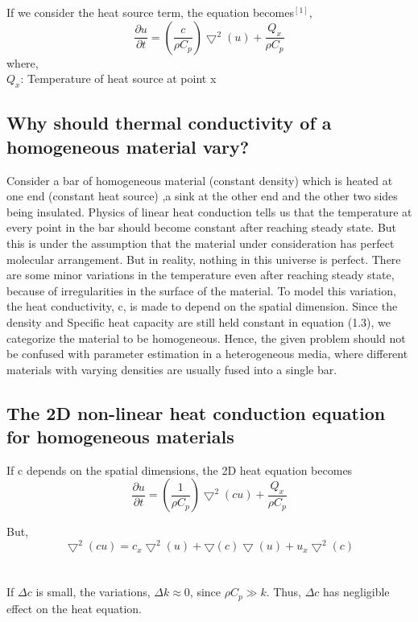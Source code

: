 \documentclass[10pt,a4paper]{report}
\begin{document}
If we consider the heat source term, the equation becomes$^{[1]}$,
\begin{equation}
\frac{\partial u}{\partial t}=(\frac{c}{\rho C_p})\bigtriangledown^2(u)+\frac{Q_x}{\rho C_p}
\end{equation}
where,\\
$Q_x$: Temperature of heat source at point x

\subsection{Why should thermal conductivity of a homogeneous material vary?}
Consider a bar of homogeneous material (constant density) which is heated at one end (constant heat source) ,a sink at the other end and the other two sides being insulated. Physics of linear heat conduction tells us that the temperature at every point in the bar should become constant after reaching steady state. But this is under the assumption that the material under consideration has perfect molecular arrangement. But in reality, nothing in this universe is perfect. There are some minor variations in the temperature even after reaching steady state, because of irregularities in the surface of the material. To model this variation, the heat conductivity, c, is made to depend on the spatial dimension. Since the density and Specific heat capacity are still held constant in equation (1.3), we categorize the material to be homogeneous.  Hence, the given problem should not be confused with parameter estimation in a heterogeneous media, where different materials with varying densities are usually fused into a single bar. 

\subsection{The 2D non-linear heat conduction equation for homogeneous materials}

If c depends on the spatial dimensions, the 2D heat equation becomes
\begin{equation}
\frac{\partial u}{\partial t}=(\frac{1}{\rho C_p})\bigtriangledown^2(cu)+\frac{Q_x}{\rho C_p}
\end{equation}

But, 
\begin{equation}
\bigtriangledown^2(cu)=c_x \bigtriangledown^2(u)+\bigtriangledown(c) \bigtriangledown(u)+u_x \bigtriangledown^2(c)
\end{equation}\\
\\
If $\Delta c$ is small, the variations, $\Delta k\approx 0$, since $\rho C_p \gg k$. Thus, $\Delta c$ has negligible effect on the heat equation.
\end{document}
